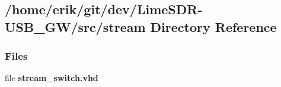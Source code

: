 \subsection{/home/erik/git/dev/\+Lime\+S\+D\+R-\/\+U\+S\+B\+\_\+\+G\+W/src/stream Directory Reference}
\label{dir_5be68f393fdf27f5b8cc2d0dd1012601}
\subsubsection*{Files}
\begin{DoxyCompactItemize}
\item 
file {\bf stream\+\_\+switch.\+vhd}
\end{DoxyCompactItemize}
